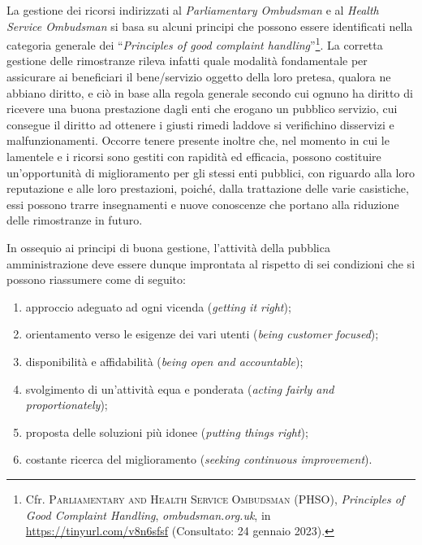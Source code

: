 \documentclass[12pt,it,a4paper,]{report}
\providecommand{\tightlist}{%
  \setlength{\itemsep}{0pt}\setlength{\parskip}{0pt}}
\begin{document}
La gestione dei ricorsi indirizzati al \emph{Parliamentary Ombudsman} e
al \emph{Health Service Ombudsman} si basa su alcuni principi che
possono essere identificati nella categoria generale dei
``\emph{Principles of good complaint handling}''\footnote{Cfr.
  \textsc{Parliamentary and Health Service Ombudsman (PHSO)},
  \emph{Principles of Good Complaint Handling}, \emph{ombudsman.org.uk},
  in \url{https://tinyurl.com/v8n6sfsf} (Consultato: 24 gennaio 2023).}.
La corretta gestione delle rimostranze rileva infatti quale modalità
fondamentale per assicurare ai beneficiari il bene/servizio oggetto
della loro pretesa, qualora ne abbiano diritto, e ciò in base alla
regola generale secondo cui ognuno ha diritto di ricevere una buona
prestazione dagli enti che erogano un pubblico servizio, cui consegue il
diritto ad ottenere i giusti rimedi laddove si verifichino disservizi e
malfunzionamenti. Occorre tenere presente inoltre che, nel momento in
cui le lamentele e i ricorsi sono gestiti con rapidità ed efficacia,
possono costituire un'opportunità di miglioramento per gli stessi enti
pubblici, con riguardo alla loro reputazione e alle loro prestazioni,
poiché, dalla trattazione delle varie casistiche, essi possono trarre
insegnamenti e nuove conoscenze che portano alla riduzione delle
rimostranze in futuro.

In ossequio ai principi di buona gestione, l'attività della pubblica
amministrazione deve essere dunque improntata al rispetto di sei
condizioni che si possono riassumere come di seguito:

\begin{enumerate}
\def\labelenumi{\arabic{enumi})}
\tightlist
\item
  approccio adeguato ad ogni vicenda (\emph{getting it right});
\item
  orientamento verso le esigenze dei vari utenti (\emph{being customer
  focused});
\item
  disponibilità e affidabilità (\emph{being open and accountable});
\item
  svolgimento di un'attività equa e ponderata (\emph{acting fairly and
  proportionately});
\item
  proposta delle soluzioni più idonee (\emph{putting things right});
\item
  costante ricerca del miglioramento (\emph{seeking continuous
  improvement}).
\end{enumerate}
\end{document}
